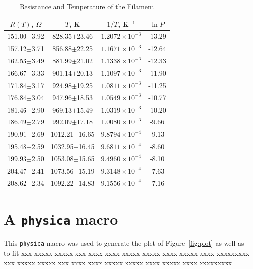 \documentclass[12pt]{article}
\begin{document}
\begin{table}[h]
\caption{Resistance and Temperature of the Filament}
\label{tab:data}
\vspace{0.15in}
\begin{center}
\begin{tabular}{|c|c|c|c|}
\hline
$R(T)$, $\Omega$ & $T$, K & $1/T$, K$^{-1}$ & $\ln P$ \\
\hline
151.00$\pm$3.92 & 828.35$\pm$23.46& $1.2072\times10^{-3}$& -13.29 \\
157.12$\pm$3.71 & 856.88$\pm$22.25& $1.1671\times10^{-3}$& -12.64 \\
162.53$\pm$3.49 & 881.99$\pm$21.02& $1.1338\times10^{-3}$& -12.33 \\
166.67$\pm$3.33 & 901.14$\pm$20.13& $1.1097\times10^{-3}$& -11.90 \\
171.84$\pm$3.17 & 924.98$\pm$19.25& $1.0811\times10^{-3}$& -11.25 \\ 
176.84$\pm$3.04 & 947.96$\pm$18.53& $1.0549\times10^{-3}$& -10.77 \\
181.46$\pm$2.90 & 969.13$\pm$15.49& $1.0319\times10^{-3}$& -10.20 \\
186.49$\pm$2.79 & 992.09$\pm$17.18& $1.0080\times10^{-3}$& -9.66 \\
190.91$\pm$2.69 & 1012.21$\pm$16.65& $9.8794\times10^{-4}$& -9.13 \\
195.48$\pm$2.59 & 1032.95$\pm$16.45& $9.6811\times10^{-4}$& -8.60 \\
199.93$\pm$2.50 & 1053.08$\pm$15.65& $9.4960\times10^{-4}$& -8.10 \\
204.47$\pm$2.41 & 1073.56$\pm$15.19& $9.3148\times10^{-4}$& -7.63 \\
208.62$\pm$2.34 & 1092.22$\pm$14.83& $9.1556\times10^{-4}$& -7.16 \\
\hline
\end{tabular}
\end{center}  
\end{table}

\newpage
\section{A {\tt physica} macro}
\label{app:macro}
This {\tt physica} macro was used to generate the plot of Figure~\ref{fig:plot}
as well as to fit xxx xxxxx xxxxx xxx xxxx xxxx xxxxx xxxxx xxxx xxxxx xxxx xxxxxxxxx
xxx xxxxx xxxxx xxx xxxx xxxx xxxxx xxxxx xxxx xxxxx xxxx xxxxxxxxx
\end{document}
